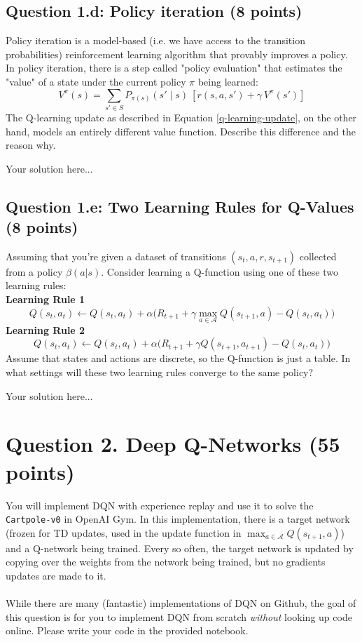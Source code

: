 \documentclass[12pt]{article}
\begin{document}
\subsection*{Question 1.d: Policy iteration (8 points)}
Policy iteration is a model-based (i.e. we have access to the transition probabilities) reinforcement learning algorithm that provably improves a policy. In policy iteration, there is a step called "policy evaluation" that estimates the "value" of a state under the current policy $\pi$ being learned:
$$ V^\pi(s) =  \sum_{s' \in S} P_{\pi(s)} (s' \mid s)\ [r(s,a,s') +  \gamma\ V^\pi(s') ] $$
The Q-learning update as described in Equation \ref{q-learning-update}, on the other hand, models an entirely different value function. Describe this difference and the reason why.

\begin{solution}
Your solution here...
\end{solution}

\subsection*{Question 1.e: Two Learning Rules for Q-Values (8 points)}
Assuming that you're given a dataset of transitions $(s_t, a, r, s_{t+1})$ collected from a policy $\beta(a \vert s)$. Consider learning a Q-function using one of these two learning rules: \\
\textbf{Learning Rule 1}
\begin{equation} 
Q(s_t,a_t) \leftarrow Q(s_t,a_t) + \alpha \biggr( R_{t+1} + \gamma \max_{a \in \mathcal{A}} Q(s_{t+1},a) - Q(s_t,a_t) \biggr)
\end{equation}
\textbf{Learning Rule 2}
\begin{equation} 
Q(s_t,a_t) \leftarrow Q(s_t,a_t) + \alpha \biggr( R_{t+1} + \gamma  Q(s_{t+1},a_{t+1}) - Q(s_t,a_t) \biggr)
\end{equation}
 Assume that states and actions are discrete, so the Q-function is just a table.
In what settings will these two learning rules converge to the same policy?
\begin{solution}
Your solution here...
\end{solution}

\section*{Question 2. Deep Q-Networks (55 points)}
You will implement DQN with experience replay and use it to solve the \texttt{Cartpole-v0} in OpenAI Gym. In this implementation, there is a target network (frozen for TD updates, used in the update function in $\max_{a \in \mathcal{A}} Q(s_{t+1}, a)$) and a Q-network being trained. Every so often, the target network is updated by copying over the weights from the network being trained, but no gradients updates are made to it. 
\\\\
While there are many (fantastic) implementations of DQN on Github, the goal of this question is for you to implement DQN from scratch \textit{without} looking up code online. Please write your code in the provided notebook.
\end{document}
